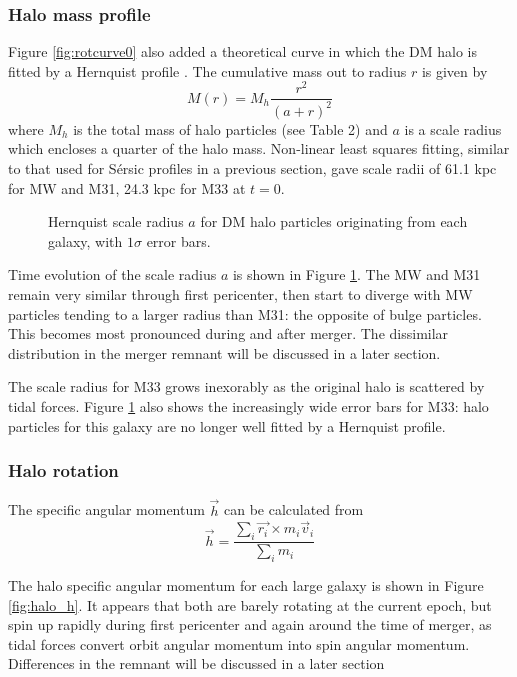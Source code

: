 \documentclass[twocolumn]{aastex63}
\begin{document}
\subsubsection{Halo mass profile}

Figure \ref{fig:rotcurve0} also added a theoretical curve in which the DM halo is fitted by a Hernquist profile \citep{hernquist_analytical_1990}. The cumulative mass out to radius $r$ is given by
\[ M(r) = M_h \frac{r^2}{(a+r)^2} \]
where $M_h$ is the total mass of halo particles (see Table 2) and $a$ is a scale radius which encloses a quarter of the halo mass. Non-linear least squares fitting, similar to that used for Sérsic profiles in a previous section, gave scale radii of 61.1 kpc for MW and M31, 24.3 kpc for M33 at $t=0$.

\begin{figure}[htb!]
	\caption{Hernquist scale radius $a$ for DM halo particles originating from each galaxy, with $1\sigma$ error bars.
		\label{fig:hernquist_a}}
\end{figure}

Time evolution of the scale radius $a$ is shown in Figure \ref{fig:hernquist_a}. The MW and M31 remain very similar through first pericenter, then start to diverge with MW particles tending to a larger radius than M31: the opposite of bulge particles. This becomes most pronounced during and after merger. The dissimilar distribution in the merger remnant will be discussed in a later section.  

The scale radius for M33 grows inexorably as the original halo is scattered by tidal forces. Figure \ref{fig:hernquist_a} also shows the increasingly wide error bars for M33: halo particles for this galaxy are no longer well fitted by a Hernquist profile.

\subsubsection{Halo rotation}

The specific angular momentum $\vec{h}$ can be calculated from
\[ \vec{h} = \frac{\sum_i{\vec{r_i} \times m_i \vec{v}_i}}{\sum_i{m_i}} \]

The halo specific angular momentum for each large galaxy is shown in Figure \ref{fig:halo_h}. It appears that both are barely rotating at the current epoch, but spin up rapidly during first pericenter and again around the time of merger, as tidal forces convert orbit angular momentum into spin angular momentum. Differences in the remnant will be discussed in a later section
\end{document}
